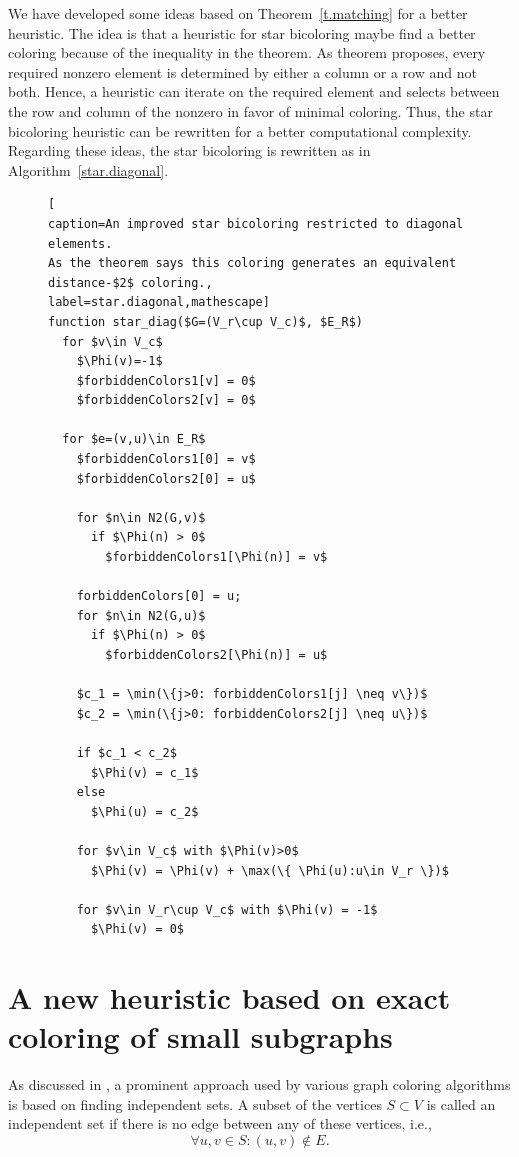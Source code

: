 \documentclass[12pt, twoside,a4paper,toc=bibliography]{scrbook}
\newcommand{\coderef}[1]{Algorithm~\protect\ref{#1}}
\begin{document}
We have developed some ideas based on Theorem~\ref{t.matching}
for a better heuristic. The idea is that a heuristic for star bicoloring maybe
find a better coloring because of the inequality in the theorem.
As theorem proposes, every required nonzero element
is determined by either a column or a row and not both. Hence, a heuristic
can iterate on the required element and selects between the row and column of
the nonzero in favor of minimal coloring.
Thus, the star bicoloring heuristic can be rewritten for a better computational complexity.
Regarding these ideas, the star bicoloring is rewritten as in \coderef{star.diagonal}.
\begin{figure}
\begin{lstlisting}[
caption=An improved star bicoloring restricted to diagonal elements.
As the theorem says this coloring generates an equivalent distance-$2$ coloring.,
label=star.diagonal,mathescape]
function star_diag($G=(V_r\cup V_c)$, $E_R$)
  for $v\in V_c$
    $\Phi(v)=-1$
    $forbiddenColors1[v] = 0$
    $forbiddenColors2[v] = 0$

  for $e=(v,u)\in E_R$
    $forbiddenColors1[0] = v$
    $forbiddenColors2[0] = u$

    for $n\in N2(G,v)$
      if $\Phi(n) > 0$
        $forbiddenColors1[\Phi(n)] = v$

    forbiddenColors[0] = u;
    for $n\in N2(G,u)$
      if $\Phi(n) > 0$
        $forbiddenColors2[\Phi(n)] = u$

    $c_1 = \min(\{j>0: forbiddenColors1[j] \neq v\})$
    $c_2 = \min(\{j>0: forbiddenColors2[j] \neq u\})$

    if $c_1 < c_2$
      $\Phi(v) = c_1$
    else
      $\Phi(u) = c_2$

    for $v\in V_c$ with $\Phi(v)>0$
      $\Phi(v) = \Phi(v) + \max(\{ \Phi(u):u\in V_r \})$

    for $v\in V_r\cup V_c$ with $\Phi(v) = -1$
      $\Phi(v) = 0$
\end{lstlisting}
\end{figure}

\section{A new heuristic based on exact coloring of small subgraphs}
\label{s.exact}
As discussed in \cite{Fomin2013}, a prominent approach used by various graph coloring
algorithms is based on finding independent sets. A subset of the vertices $S\subset V$ is
called an independent set if there is no edge between any of these vertices, i.e.,
$$
\forall u,v\in S: (u,v)\notin E.
$$
\end{document}
